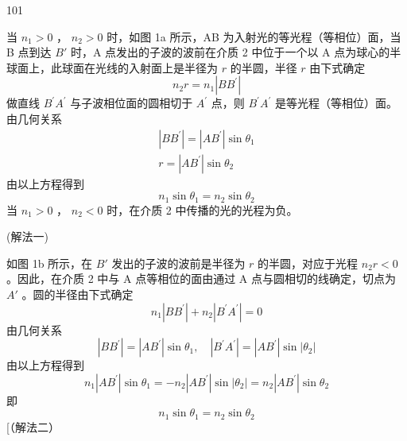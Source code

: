 \begin{solution}{101}
    \begin{subsolution}
        当 $n_{1}>0$ ， $n_{2}>0$ 时，如图 1a 所示，AB 为入射光的等光程（等相位）面，当 B 点到达 $B'$ 时，A 点发出的子波的波前在介质 2 中位于一个以 A 点为球心的半球面上，此球面在光线的入射面上是半径为 $r$ 的半圆，半径 $r$ 由下式确定
        \begin{equation}
            n _ {2} r = n _ {1} \left| B B ^ {\prime} \right|
            \label{eq:1.p101}
        \end{equation}
        做直线 $B^{\prime}A^{\prime}$ 与子波相位面的圆相切于 $A^{\prime}$ 点，则 $B^{\prime}A^{\prime}$ 是等光程（等相位）面。由几何关系
        \begin{align*}
            \left| B B ^ {\prime} \right| = \left| A B ^ {\prime} \right| \sin \theta_ {1} \\
            r = \left| A B ^ {\prime} \right| \sin \theta_ {2}
        \end{align*}
        由以上方程得到
        \begin{equation}
            n _ {1} \sin \theta_ {1} = n _ {2} \sin \theta_ {2}
            \label{eq:2.p101}
        \end{equation}
        当 $n_{1}>0$ ， $n_{2}<0$ 时，在介质 2 中传播的光的光程为负。

        (解法一)

        如图 1b 所示，在 $B'$ 发出的子波的波前是半径为 $r$ 的半圆，对应于光程 $n_{2}r < 0$ 。因此，在介质 2 中与 A 点等相位的面由通过 A 点与圆相切的线确定，切点为 $A'$ 。圆的半径由下式确定
        \begin{equation}
            n _ {1} \left| B B ^ {\prime} \right| + n _ {2} \left| B ^ {\prime} A ^ {\prime} \right| = 0
            \label{eq:3.p101}
        \end{equation}
        由几何关系
        \begin{equation*}
            \left| B B ^ {\prime} \right| = \left| A B ^ {\prime} \right| \sin \theta_ {1}, \quad \left| B ^ {\prime} A ^ {\prime} \right| = \left| A B ^ {\prime} \right| \sin \left| \theta_ {2} \right|
        \end{equation*}
        由以上方程得到
        \begin{equation}
            n _ {1} \left| A B ^ {\prime} \right| \sin \theta_ {1} = - n _ {2} \left| A B ^ {\prime} \right| \sin \left| \theta_ {2} \right| = n _ {2} \left| A B ^ {\prime} \right| \sin \theta_ {2}
            \label{eq:4.p101}
        \end{equation}
        即
        \begin{equation}
            n _ {1} \sin \theta_ {1} = n _ {2} \sin \theta_ {2}
            \label{eq:5.p101}
        \end{equation}
        [（解法二）


\end{subsolution}
\end{solution}
